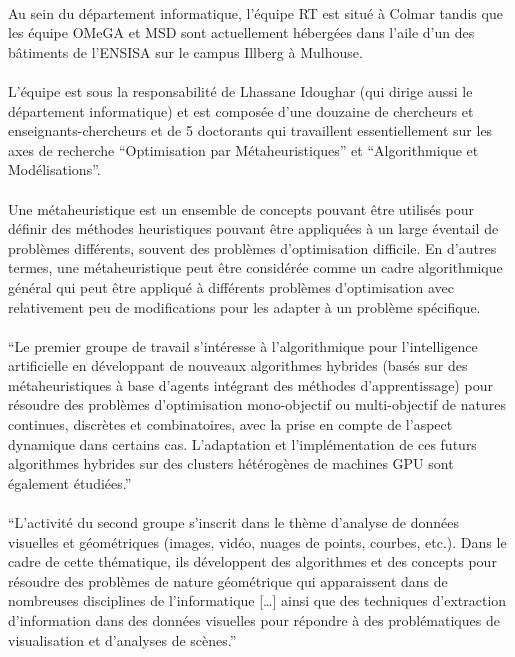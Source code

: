 \documentclass[a4paper,11pt,twoside,french,report]{../common/simplem}
\begin{document}
				\paragraph*{}
					Au sein du département informatique, l'équipe \gls{RT} est situé à Colmar tandis que les équipe \gls{OMeGA} et \gls{MSD} sont actuellement hébergées dans l'aile d'un des bâtiments de l'\gls{ENSISA} sur le campus Illberg à Mulhouse.
				\paragraph*{}
					L'équipe est sous la responsabilité de Lhassane Idoughar (qui dirige aussi le département informatique) et est composée d'une douzaine de chercheurs et enseignants-chercheurs et de 5 doctorants qui travaillent essentiellement sur les axes de recherche ``Optimisation par Métaheuristiques'' et ``Algorithmique et Modélisations''.
				\paragraph*{}
					Une métaheuristique est un ensemble de concepts pouvant être utilisés pour définir des méthodes heuristiques pouvant être appliquées à un large éventail de problèmes différents, souvent des problèmes d’optimisation difficile. En d'autres termes, une métaheuristique peut être considérée comme un cadre algorithmique général qui peut être appliqué à différents problèmes d'optimisation avec relativement peu de modifications pour les adapter à un problème spécifique.
				\paragraph*{}
					``Le premier groupe de travail s’intéresse à l’algorithmique pour l’intelligence artificielle en développant de nouveaux algorithmes hybrides (basés sur des métaheuristiques à base d’agents intégrant des méthodes d’apprentissage) pour résoudre des problèmes d'optimisation mono-objectif ou multi-objectif de natures continues, discrètes et combinatoires, avec la prise en compte de l’aspect dynamique dans certains cas. L’adaptation et l’implémentation de ces futurs algorithmes hybrides sur des clusters hétérogènes de machines GPU sont également étudiées.''~\cite{IRIMAS_OMeGA}
				\paragraph*{}
					``L’activité du second groupe s’inscrit dans le thème d’analyse de données visuelles et géométriques (images, vidéo, nuages de points, courbes, etc.). Dans le cadre de cette thématique, ils développent des algorithmes et des concepts pour résoudre des problèmes de nature géométrique qui apparaissent dans de nombreuses disciplines de l’informatique [\ldots] ainsi que des techniques d’extraction d’information dans des données visuelles pour répondre à des problématiques de visualisation et d’analyses de scènes.''~\cite{IRIMAS_OMeGA}
\end{document}
